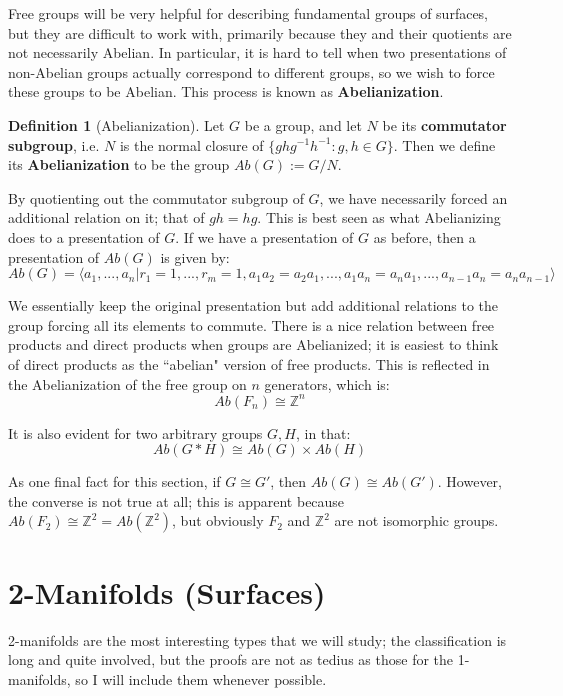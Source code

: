 \documentclass[11pt, oneside]{amsart}   	%
\theoremstyle{definition}
\newtheorem{definition}{Definition}[section]
\begin{document}
	Free groups will be very helpful for describing fundamental groups of surfaces, but they are difficult to work with, primarily because they and their quotients 
	are not necessarily Abelian. In particular, it is hard to tell when two presentations of non-Abelian groups actually correspond to different groups, so we wish 
	to force these groups to be Abelian. This process is known as \textbf{Abelianization}.
	
	\begin{definition}[Abelianization]
		Let $G$ be a group, and let $N$ be its \textbf{commutator subgroup}, i.e. $N$ is the normal closure of $\{ghg^{-1}h^{-1} : g, h\in G\}$. Then we 
		define its \textbf{Abelianization} to be the group $Ab(G) := G / N$.
	\end{definition} 
	
	By quotienting out the commutator subgroup of $G$, we have necessarily forced an additional relation on it; that of $gh = hg$. This is best seen as what 
	Abelianizing does to a presentation of $G$. If we have a presentation of $G$ as before, then a presentation of $Ab(G)$ is given by:
	$$
		Ab(G) = \langle a_1, ..., a_n | r_1 = 1, ..., r_m = 1, a_1a_2 = a_2a_1, ..., a_1a_n = a_na_1, ..., a_{n - 1}a_n = a_na_{n - 1}\rangle
	$$
	
	We essentially keep the original presentation but add additional relations to the group forcing all its elements to commute. There is a nice relation between 
	free products and direct products when groups are Abelianized; it is easiest to think of direct products as the ``abelian" version of free products. This is 
	reflected in the Abelianization of the free group on $n$ generators, which is:
	$$
		Ab(F_n)\cong\mathbb Z^n
	$$
	 
	 It is also evident for two arbitrary groups $G, H$, in that:
	 $$
	 	Ab(G*H) \cong Ab(G)\times Ab(H)
	 $$
	
	As one final fact for this section, if $G \cong G'$, then $Ab(G)\cong Ab(G')$. However, the converse is not true at all; this is apparent because $Ab(F_2)\cong 
	\mathbb Z^2 = Ab(\mathbb Z^2)$, but obviously $F_2$ and $\mathbb Z^2$ are not isomorphic groups.
	

\section{2-Manifolds (Surfaces)}

	2-manifolds are the most interesting types that we will study; the classification is long and quite involved, but the proofs are not as tedius as those for the 
	1-manifolds, so I will include them whenever possible. 
	
\end{document}
